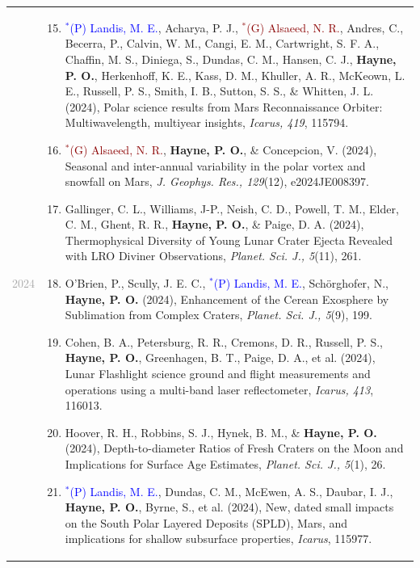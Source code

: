 \documentclass[letterpaper,10pt,twoside]{article}
\begin{document}
\begin{longtable}{@{} p{} p{}}
\noindent\textcolor{darkgray}{2024} &
        \begin{enumerate}[leftmargin=!,labelindent=2.5pt,itemindent=-10pt]\setcounter{enumi}{14}
            \item{\small \textcolor{blue}{$^*$(P) Landis, M. E.}, Acharya, P. J., \textcolor{darkred}{$^*$(G) Alsaeed, N. R.}, Andres, C., Becerra, P., Calvin, W. M., Cangi, E. M., Cartwright, S. F. A., Chaffin, M. S., Diniega, S., Dundas, C. M., Hansen, C. J., \textbf{Hayne, P. O.}, Herkenhoff, K. E., Kass, D. M., Khuller, A. R., McKeown, L. E., Russell, P. S., Smith, I. B., Sutton, S. S., \& Whitten, J. L. (2024), Polar science results from Mars Reconnaissance Orbiter: Multiwavelength, multiyear insights, \textit{Icarus, 419}, 115794.
            }
            \item{\small \textcolor{darkred}{$^*$(G) Alsaeed, N. R.}, \textbf{Hayne, P. O.}, \& Concepcion, V. (2024), Seasonal and inter-annual variability in the polar vortex and snowfall on Mars, \textit{J. Geophys. Res., 129}(12), e2024JE008397.
            }
            \item{\small Gallinger, C. L., Williams, J-P., Neish, C. D., Powell, T. M., Elder, C. M., Ghent, R. R., \textbf{Hayne, P. O.}, \& Paige, D. A. (2024), Thermophysical Diversity of Young Lunar Crater Ejecta Revealed with LRO Diviner Observations, \textit{Planet. Sci. J., 5}(11), 261.
            }
            \item{\small O'Brien, P., Scully, J. E. C., \textcolor{blue}{$^*$(P) Landis, M. E.}, Schörghofer, N., \textbf{Hayne, P. O.} (2024), Enhancement of the Cerean Exosphere by Sublimation from Complex Craters, \textit{Planet. Sci. J., 5}(9), 199.
            }
            \item{\small Cohen, B. A., Petersburg, R. R., Cremons, D. R., Russell, P. S., \textbf{Hayne, P. O.}, Greenhagen, B. T., Paige, D. A., et al. (2024), Lunar Flashlight science ground and flight measurements and operations using a multi-band laser reflectometer, \textit{Icarus, 413}, 116013.
            }
            \item{\small Hoover, R. H., Robbins, S. J., Hynek, B. M., \& \textbf{Hayne, P. O.} (2024), Depth-to-diameter Ratios of Fresh Craters on the Moon and Implications for Surface Age Estimates, \textit{Planet. Sci. J., 5}(1), 26.
            }
            \item{\small \textcolor{blue}{$^*$(P) Landis, M. E.}, Dundas, C. M., McEwen, A. S., Daubar, I. J., \textbf{Hayne, P. O.}, Byrne, S., et al. (2024), New, dated small impacts on the South Polar Layered Deposits (SPLD), Mars, and implications for shallow subsurface properties, \textit{Icarus}, 115977.
}
\end{enumerate}
\end{longtable}
\end{document}
